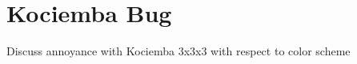 
\chapter{Kociemba Bug} %

\label{sec:Kociemba} %


Discuss annoyance with Kociemba 3x3x3 with respect to color scheme










